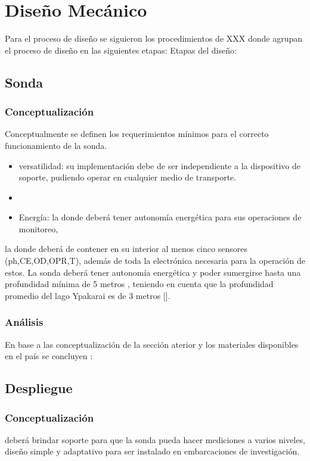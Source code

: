 \section{Dise\~no Mec\'anico}
Para el proceso de dise\~no se siguieron los procedimientos de XXX donde agrupan el proceso de dise\~no en las siguientes etapas:
Etapas del dise\~no: 

\subsection{Sonda}
\subsubsection{Conceptualizaci\'on}
Conceptualmente se definen los requerimientos m\'inimos para el correcto funcionamiento de la sonda.
\begin{itemize}
    \item versatilidad: su implementación debe de ser independiente a la dispositivo de soporte, pudiendo operar en cualquier medio de transporte.
    \item 
    \item Energ\'ia: la donde deber\'a tener autonom\'ia energ\'etica para sus operaciones de monitoreo,  
\end{itemize}
la donde deberá de contener en su interior al menos cinco sensores  (ph,CE,OD,OPR,T), adem\'as de toda la electr\'onica necesaria para la operaci\'on de estos. La sonda deber\'a tener autonom\'ia energ\'etica y poder sumergirse hasta una profundidad m\'inima de 5 metros , teniendo en cuenta que la profundidad promedio del lago Ypakarai es de 3 metros [\cite{hidrologiaItaipu}].
   
\subsubsection{An\'alisis}
En base a las conceptualizaci\'on de la secci\'on aterior y los materiales disponibles en el pa\'is se concluyen  :


\subsection{Despliegue}
\subsubsection{Conceptualizaci\'on}

deber\'a brindar soporte para que la sonda pueda hacer mediciones a varios niveles, dise\~no simple y adaptativo para ser instalado en embarcaciones de investigaci\'on.

